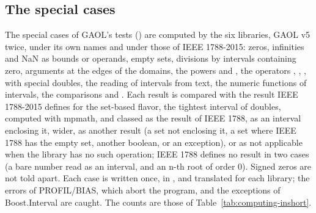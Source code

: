\subsection{The special cases}
\label{sec:computing-special-cases}
%

The special cases of GAOL's tests () are computed by the six
libraries, GAOL v5 twice, under its own names and under those of IEEE
1788-2015: zeros, infinities and NaN as bounds or operands, empty sets,
divisions by intervals containing zero, arguments at the edges of the
domains, the powers  and , the operators \code{+=},
\code{-=}, \code{*=}, \code{/=} with special doubles, the reading of
intervals from text, the numeric functions of intervals, the comparisons
and . Each result is compared with the result IEEE 1788-2015
defines for the set-based flavor, the tightest interval of doubles, computed
with mpmath, and classed as the result of IEEE 1788, as an interval
enclosing it, wider, as another result (a set not enclosing it, a set where
IEEE 1788 has the empty set, another boolean, or an exception), or as not
applicable when the library has no such operation; IEEE 1788 defines no
result in two cases (a bare number read as an interval, and an n-th root of order 0). Signed zeros are not told apart. Each case is written
once, in , and translated for each library; the errors
of PROFIL/BIAS, which abort the program, and the exceptions of
Boost.Interval are caught. The counts are those of
Table~\ref{tab:computing-inshort}.

